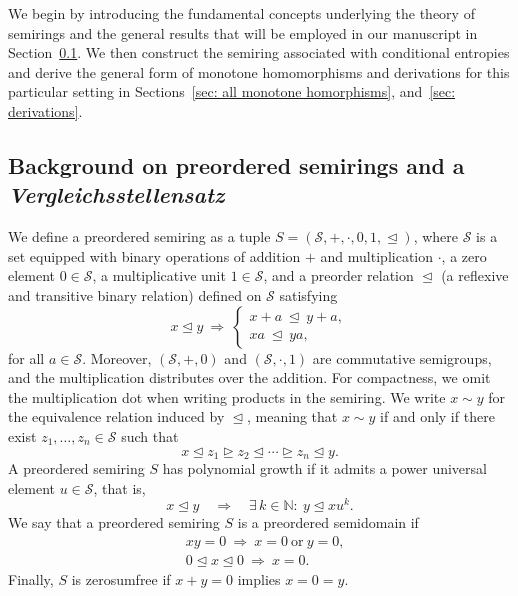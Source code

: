 \documentclass[aps,pra,11pt,onecolumn,nofootinbib,tightenlines]{revtex4-2}
\theoremstyle{definition}
\newcommand{\rleq}{\trianglelefteq}
\newcommand{\rgeq}{\trianglerighteq}
\begin{document}
We begin by introducing the fundamental concepts underlying the theory of semirings and the general results that will be employed in our manuscript in Section~\ref{sec: background semiring}. We then construct the semiring associated with conditional entropies and derive the general form of monotone homomorphisms and derivations for this particular setting in Sections~\ref{sec: all monotone homorphisms}, and~\ref{sec: derivations}.

\subsection{Background on preordered semirings and a \textit{Vergleichsstellensatz}}
\label{sec: background semiring}
We define a preordered semiring as a tuple $S = (\mathcal{S}, +, \cdot, 0, 1, \rleq)$, where $\mathcal{S}$ is a set equipped with binary operations of addition $+$ and multiplication $\cdot$, a zero element $0 \in \mathcal{S}$, a multiplicative unit $1 \in \mathcal{S}$, and a preorder relation $\rleq$  (a reflexive and transitive binary relation) defined on $\mathcal{S}$  satisfying
\begin{equation}
    x \rleq y \ \Rightarrow \ 
\begin{cases}
x + a \ \rleq\ y + a, \\[0.3em]
x a \ \rleq\ y a,
\end{cases}
\end{equation}
for all $a \in \mathcal{S}$.
Moreover, 
$(\mathcal{S}, +, 0)$ and $(\mathcal{S}, \cdot, 1)$ are commutative semigroups, and the multiplication distributes over the addition.
For compactness, we omit the multiplication dot when writing products in the semiring.
We write $x \sim y$ for the equivalence relation induced by $\rleq$, meaning that $x \sim y$ if and only if there exist $z_1, \ldots, z_n \in \mathcal{S}$ such that
\begin{equation}
    x \rleq z_1 \rgeq z_2 \rleq \cdots \rgeq z_n \rleq y.
\end{equation}
A preordered semiring $S$ has polynomial growth if it admits a power universal element $u \in \mathcal{S}$, that is,
\begin{equation}
    x \rleq y \quad \Rightarrow \quad \exists\, k \in \mathbb{N}:\ y \rleq x u^k.
\end{equation}
We say that a preordered semiring $S$ is a preordered semidomain if
\begin{equation}
    \begin{aligned}
&xy = 0 \ \Rightarrow\ x = 0 \ \text{or} \ y = 0, \\
&0 \rleq x \rleq 0 \ \Rightarrow\ x = 0.
\end{aligned}
\end{equation}
Finally, $S$ is zerosumfree if $x + y = 0$ implies $x = 0 = y$.
\end{document}
